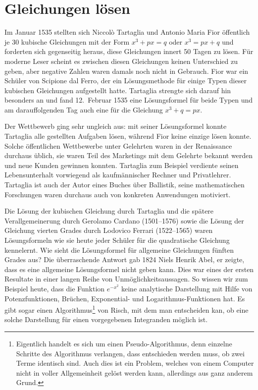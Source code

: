 %
%
%
\chapter{Gleichungen lösen\label{chapter:gleichungen}}
Im Januar 1535 stellten sich Niccolò Tartaglia und 
Antonio Maria Fior öffentlich je 30 kubische Gleichungen mit
der Form $x^3 + px = q$ oder $x^3 = px + q$ und forderten sich
gegenseitig heraus, diese Gleichungen innert 50 Tagen zu lösen.
Für moderne Leser scheint es zwischen diesen Gleichungen keinen 
Unterschied zu geben, aber negative Zahlen waren damals noch nicht
in Gebrauch.
Fior war ein Schüler von Scipione dal Ferro, der ein Lösungsmethode
für einige Typen dieser kubischen Gleichungen aufgestellt hatte.
Tartaglia strengte sich darauf hin besonders an und fand 12.~Februar
1535 eine Lösungsformel für beide Typen und am darauffolgenden Tag
auch eine für die Gleichung $x^3 + q = px$.

Der Wettbewerb ging sehr ungleich aus: mit seiner Lösungsformel konnte
Tartaglia alle gestellten Aufgaben lösen, während Fior keine einzige
lösen konnte.
Solche öffentlichen Wettbewerbe unter Gelehrten waren in der
Renaissance durchaus üblich, sie waren Teil des Marketings mit dem
Gelehrte bekannt werden und neue Kunden gewinnen konnten.
Tartaglia zum Beispiel verdiente seinen Lebensunterhalt vorwiegend
als kaufmännischer Rechner und Privatlehrer.
Tartaglia ist auch der Autor eines Buches über Ballistik, seine
mathematischen Forschungen waren durchaus auch von konkreten 
Anwendungen motiviert.

Die Lösung der kubischen Gleichung durch Tartaglia und die spätere
Verallgemeinerung durch Gerolamo Cardano (1501--1576) sowie die 
Lösung der Gleichung vierten Grades durch Lodovico Ferrari (1522--1565)
waren Lösungsformeln wie sie heute jeder Schüler für die quadratische
Gleichung kennelernt.
Wie sieht die Lösungsformel für allgemeine Gleichungen fünften
Grades aus?
Die überraschende Antwort gab 1824 Niels Henrik Abel, er zeigte,
dass es eine allgemeine Lösungsformel nicht geben kann.
Dies war eines der ersten Resultate in einer langen Reihe von
Unmöglichkeitsaussagen.
So wissen wir zum Beispiel heute, dass die Funktion $e^{-x^2}$ 
keine analytische Darstellung mit Hilfe von Potenzfunktionen,
Brüchen, Exponential- und Logarithmus-Funktionen hat.
Es gibt sogar einen Algorithmus\footnote{Eigentlich handelt es
sich um einen Pseudo-Algorithmus, denn einzelne Schritte des Algorithmus
verlangen, dass entschieden werden muss, ob zwei Terme identisch sind.
Auch dies ist ein Problem, welches von einem Computer nicht in voller
Allgemeinheit gelöst werden kann, allerdings aus ganz anderem Grund.}
von Risch, mit dem man entscheiden kan, ob eine solche Darstellung
für einen vorgegebenen Integranden möglich ist.

